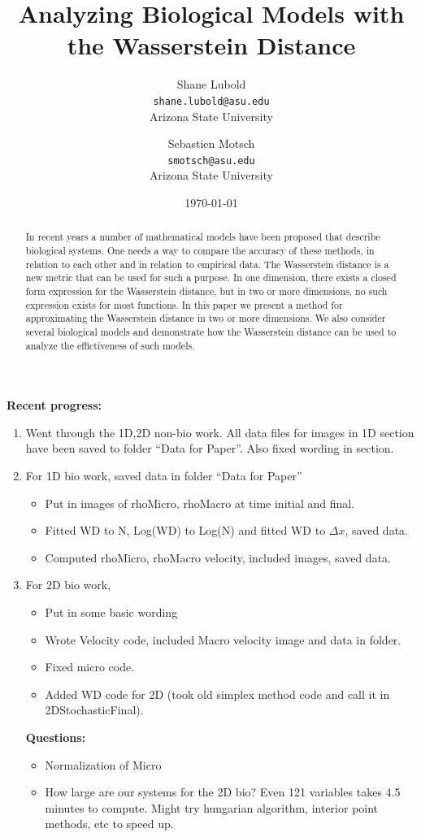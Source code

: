 \documentclass[10pt]{article}
\title{Analyzing Biological Models with the Wasserstein Distance}
\author{
  Shane Lubold\\
  \texttt{shane.lubold@asu.edu}\\
  Arizona State University
  \and
  Sebastien Motsch \\
  \texttt{smotsch@asu.edu}\\
  Arizona State University
}
\date{\today}
\begin{document}
\maketitle


\begin{abstract}
In recent years a number of mathematical models have been proposed that describe biological systems. One needs a way to compare the accuracy of these methods, in relation to each other and in relation to empirical data. The Wasserstein distance is a new metric that can be used for such a purpose. In one dimension, there exists a closed form expression for the Wasserstein distance, but in two or more dimensions, no such expression exists for most functions. In this paper we present a method for approximating the Wasserstein distance in two or more dimensions. We also consider several biological models and demonstrate how the Wasserstein distance can be used to analyze the effictiveness of such models.
\end{abstract}


\begin{center}
\textbf{Recent progress:}
\end{center}

\begin{enumerate}
\item Went through the 1D,2D non-bio work. All data files for images in 1D section have been saved to folder ``Data for Paper''. Also fixed wording in section. 
\item For 1D bio work, saved data in folder ``Data for Paper''
\begin{itemize}
\item Put in images of rhoMicro, rhoMacro at time initial and final. 
\item Fitted WD to N, Log(WD) to Log(N) and fitted WD to $\Delta x$, saved data.
\item Computed rhoMicro, rhoMacro velocity, included images, saved data.
\end{itemize}
\item For 2D bio work, 
\begin{itemize}
\item Put in some basic wording
\item Wrote Velocity code, included Macro velocity image and data in folder. 
\item Fixed micro code.
\item Added WD code for 2D (took old simplex method code and call it in 2DStochasticFinal).
\end{itemize}
\textbf{Questions:} 
\begin{itemize}
\item Normalization of Micro
\item How large are our systems for the 2D bio? Even 121 variables takes 4.5 minutes to compute. Might try hungarian algorithm, interior point methods, etc to speed up.
\end{itemize}
\end{enumerate}
\end{document}
